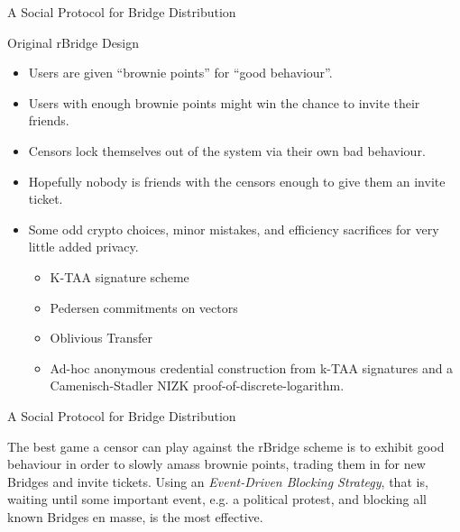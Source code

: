\documentclass[9pt,a4paper]{beamer}
\begin{document}
\begin{frame}{A Social Protocol for Bridge Distribution}
  \begin{block}{Original rBridge Design}
    \begin{itemize}
      \item<2-> Users are given ``brownie points'' for ``good behaviour''.
      \item<3-> Users with enough brownie points might win the chance to invite their friends.
      \item<4-> Censors lock themselves out of the system via their own bad behaviour.
      \item<5-> Hopefully nobody is friends with the censors enough to give them an invite ticket.
      \item<6-> Some odd crypto choices, minor mistakes, and efficiency sacrifices for very little
        added privacy.
        \begin{itemize}
          \item<7-> K-TAA signature scheme
          \item<8-> Pedersen commitments on vectors
          \item<9-> Oblivious Transfer
          \item<10-> Ad-hoc anonymous credential construction from k-TAA signatures and
            a Camenisch-Stadler NIZK proof-of-discrete-logarithm.
        \end{itemize}
    \end{itemize}
  \end{block}

\end{frame}


\begin{frame}{A Social Protocol for Bridge Distribution}

  The best game a censor can play against the rBridge scheme is to exhibit good behaviour in order
  to slowly amass brownie points, trading them in for new Bridges and invite tickets. Using an
  \emph{Event-Driven Blocking Strategy}, that is, waiting until some important event, e.g. a
  political protest, and blocking all known Bridges en masse, is the most effective.


\end{frame}
\end{document}
